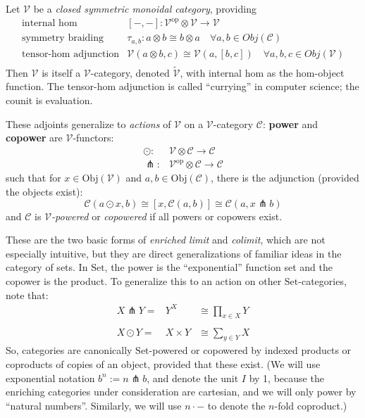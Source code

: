 \documentclass{amsart}
\theoremstyle{definition}
\newcommand{\Set}{\mathrm{Set}}
\newcommand{\op}{\mathrm{op}}
\newcommand{\V}{\mathscr{V}}
\newcommand{\C}{\mathscr{C}}
\newcommand{\pfk}{\pitchfork}
\newcommand{\maps}{\colon}
\begin{document}
Let $\V$ be a \textit{closed symmetric monoidal category}, providing
\[\begin{array}{rl}
\text{internal hom} & [-,-]\maps\V^\op\otimes \V \to \V\\
\text{symmetry braiding} & \tau_{a,b}\maps a\otimes b\cong b\otimes a \quad \forall a,b \in Obj(\C)\\
\text{tensor-hom adjunction} & \V(a\otimes b,c) \cong \V(a,[b,c]) \quad \forall a,b,c \in Obj(\V)\\
\end{array}\]
Then $\V$ is itself a $\V$-category, denoted $\tilde{\V}$, with internal hom as the hom-object function. The tensor-hom adjunction is called ``currying'' in computer science; the counit is evaluation.

These adjoints generalize to \textit{actions} of $\V$ on a $\V$-category $\C$: \textbf{power} and \textbf{copower} are $\V$-functors:
\[\begin{array}{rl}
	\odot \maps & \V \otimes \C \to \C\\
	\pfk \maps & \V^{\op} \otimes \C \to \C
\end{array}\]
such that for $x \in \text{Obj}(\V)$ and $a,b \in \text{Obj}(\C)$, there is the adjunction (provided the objects exist):
\begin{equation}\label{eq:co-power}
	\C(a\odot x,b) \cong \left[x, \C(a,b)\right] \cong \C(a,x\pfk b)
\end{equation}
and $\C$ is \textit{$\V$-powered} or \textit{copowered} if all powers or copowers exist.

These are the two basic forms of \textit{enriched limit} and \textit{colimit}, which are not especially intuitive, but they are direct generalizations of familiar ideas in the category of sets. In $\Set$, the power is the ``exponential'' function set and the copower is the product. To generalize this to an action on other $\Set$-categories, note that:
\[\begin{array}{lcr}
	X \pfk Y = & Y^X & \cong \prod_{x\in X}Y\\
	\\
	X \odot Y = & X \times Y & \cong \sum_{y\in Y}X
\end{array}\]
So, categories are canonically $\Set$-powered or copowered by indexed products or coproducts of copies of an object, provided that these exist. (We will use exponential notation $b^n := n\pfk b$, and denote the unit $I$ by 1, because the enriching categories under consideration are cartesian, and we will only power by ``natural numbers''. Similarly, we will use $n \cdot -$ to denote the $n$-fold coproduct.)
\end{document}
